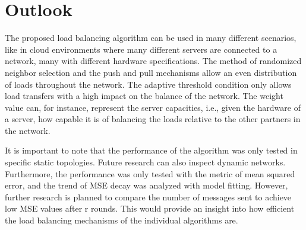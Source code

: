 \chapter{Outlook}\label{chap:outlook}
The proposed load balancing algorithm can be used in many different scenarios, like in cloud environments where many different servers are connected to a network, many with different hardware specifications. The method of randomized neighbor selection and the push and pull mechanisms allow an even distribution of loads throughout the network. The adaptive threshold condition only allows load transfers with a high impact on the balance of the network. The weight value can, for instance, represent the server capacities, i.e., given the hardware of a server, how capable it is of balancing the loads relative to the other partners in the network.

It is important to note that the performance of the algorithm was only tested in specific static topologies. Future research can also inspect dynamic networks. Furthermore, the performance was only tested with the metric of mean squared error, and the trend of MSE decay was analyzed with model fitting. However, further research is planned to compare the number of messages sent to achieve low MSE values after r rounds. This would provide an insight into how efficient the load balancing mechanisms of the individual algorithms are.